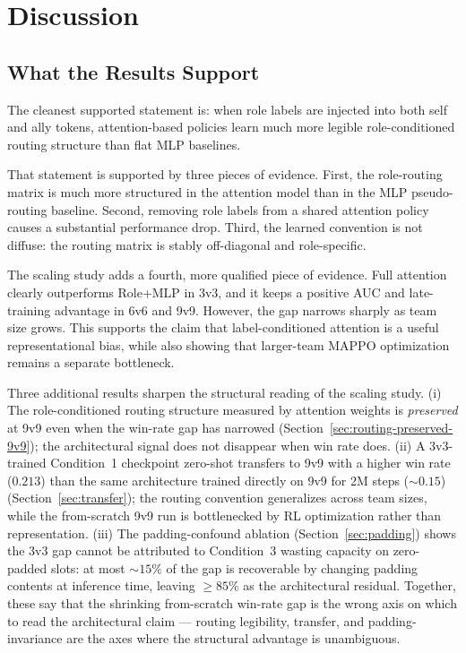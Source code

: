 \section{Discussion}
\label{sec:discussion}

\subsection{What the Results Support}

The cleanest supported statement is: when role labels are injected into both self and ally tokens, attention-based policies learn much more legible role-conditioned routing structure than flat MLP baselines.

That statement is supported by three pieces of evidence. First, the role-routing matrix is much more structured in the attention model than in the MLP pseudo-routing baseline. Second, removing role labels from a shared attention policy causes a substantial performance drop. Third, the learned convention is not diffuse: the routing matrix is stably off-diagonal and role-specific.

The scaling study adds a fourth, more qualified piece of evidence. Full attention clearly outperforms Role+MLP in 3v3, and it keeps a positive AUC and late-training advantage in 6v6 and 9v9. However, the gap narrows sharply as team size grows. This supports the claim that label-conditioned attention is a useful representational bias, while also showing that larger-team MAPPO optimization remains a separate bottleneck.

Three additional results sharpen the structural reading of the scaling study. (i) The role-conditioned routing structure measured by attention weights is \emph{preserved} at 9v9 even when the win-rate gap has narrowed (Section~\ref{sec:routing-preserved-9v9}); the architectural signal does not disappear when win rate does. (ii) A 3v3-trained Condition~1 checkpoint zero-shot transfers to 9v9 with a higher win rate ($0.213$) than the same architecture trained directly on 9v9 for 2M steps ($\sim 0.15$) (Section~\ref{sec:transfer}); the routing convention generalizes across team sizes, while the from-scratch 9v9 run is bottlenecked by RL optimization rather than representation. (iii) The padding-confound ablation (Section~\ref{sec:padding}) shows the 3v3 gap cannot be attributed to Condition~3 wasting capacity on zero-padded slots: at most $\sim 15\%$ of the gap is recoverable by changing padding contents at inference time, leaving $\geq 85\%$ as the architectural residual. Together, these say that the shrinking from-scratch win-rate gap is the wrong axis on which to read the architectural claim --- routing legibility, transfer, and padding-invariance are the axes where the structural advantage is unambiguous.

